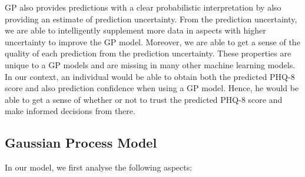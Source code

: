 \documentclass{article}
\begin{document}
	GP also provides predictions with a clear probabilistic interpretation by also providing an estimate of prediction uncertainty. 
	From the prediction uncertainty, we are able to intelligently supplement more data in aspects with higher uncertainty to improve the GP model. 
	Moreover, we are able to get a sense of the quality of each prediction from the prediction uncertainty. 
	These properties are unique to a GP models and are missing in many other machine learning models.
	In our context, an individual would be able to obtain both the predicted PHQ-8 score and also prediction confidence when using a GP model. 
	Hence, he would be able to get a sense of whether or not to trust the predicted PHQ-8 score and make informed decisions from there.\\
	
	\subsection{Gaussian Process Model} \label{audio_feats}
	In our model, we first analyse the following aspects:
\end{document}
